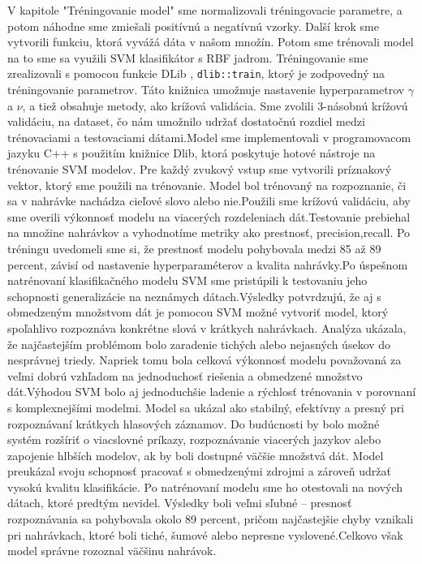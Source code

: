 \documentclass[english,12pt,oneside,a4paper]{article}
\begin{document}
	V kapitole "Tréningovanie model" sme normalizovali tréningovacie parametre, a potom náhodne sme zmiešali positívnú a negatívnú vzorky. Další krok sme vytvorili funkciu, ktorá vyvážá dáta v našom množín. Potom sme trénovali model na to sme sa využili SVM klasifikátor s RBF jadrom. Tréningovanie sme zrealizovali s pomocou funkcie DLib , \verb|dlib::train|, ktorý je zodpovedný na tréningovanie parametrov. Táto knižnica umožnuje nastavenie hyperparametrov $\gamma$ a $\nu$, a tiež obsahuje metody, ako krížová validácia. Sme zvolili 3-násobnú krížovú validáciu, na dataset, čo nám umožnilo udržať dostatočnú rozdiel medzi trénovaciami a testovaciami dátami.Model sme implementovali v programovacom jazyku C++ s použitím knižnice Dlib, ktorá poskytuje hotové nástroje na trénovanie SVM modelov. Pre každý zvukový vstup sme vytvorili príznakový vektor, ktorý sme použili na trénovanie. Model bol trénovaný na rozpoznanie, či sa v nahrávke nachádza cieľové slovo alebo nie.Použili sme krížovú validáciu, aby sme overili výkonnosť modelu na viacerých rozdeleniach dát.Testovanie prebiehal na množine nahrávkov a vyhodnotíme metriky ako prestnosť, precision,recall.  Po tréningu uvedomeli sme si, že prestnosť modelu pohybovala medzi 85 až 89 percent, závisí od nastavenie hyperparaméterov a kvalita nahrávky.Po úspešnom natrénovaní klasifikačného modelu SVM sme pristúpili k testovaniu jeho schopnosti generalizácie na neznámych dátach.Výsledky potvrdzujú, že aj s obmedzeným množstvom dát je pomocou SVM možné vytvoriť model, ktorý spoľahlivo rozpoznáva konkrétne slová v krátkych nahrávkach. Analýza ukázala, že najčastejším problémom bolo zaradenie tichých alebo nejasných úsekov do nesprávnej triedy. Napriek tomu bola celková výkonnosť modelu považovaná za veľmi dobrú vzhľadom na jednoduchosť riešenia a obmedzené množstvo dát.Výhodou SVM bolo aj jednoduchšie ladenie a rýchlosť trénovania v porovnaní s komplexnejšími modelmi. Model sa ukázal ako stabilný, efektívny a presný pri rozpoznávaní krátkych hlasových záznamov. Do budúcnosti by bolo možné systém rozšíriť o viacslovné príkazy, rozpoznávanie viacerých jazykov alebo zapojenie hlbších modelov, ak by boli dostupné väčšie množstvá dát. Model preukázal svoju schopnosť pracovať s obmedzenými zdrojmi a zároveň udržať vysokú kvalitu klasifikácie. Po natrénovaní modelu sme ho otestovali na nových dátach, ktoré predtým nevidel. Výsledky boli veľmi sľubné – presnosť rozpoznávania sa pohybovala okolo 89 percent, pričom najčastejšie chyby vznikali pri nahrávkach, ktoré boli tiché, šumové alebo nepresne vyslovené.Celkovo však model správne rozoznal väčšinu nahrávok.
\end{document}
